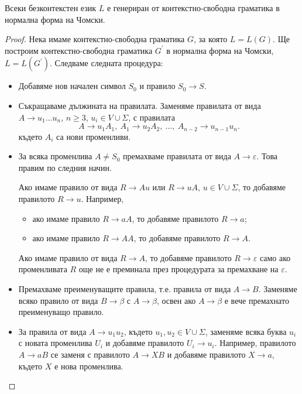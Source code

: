 \begin{thm}
  Всеки безконтекстен език $L$ е генериран от контекстно-свободна
  граматика в нормална форма на Чомски.
\end{thm}
\begin{proof}
  Нека имаме контекстно-свободна граматика $G$, за която $L = L(G)$.
  Ще построим контекстно-свободна граматика $G^\prime$ в нормална форма на Чомски, $L = L(G^\prime)$.
  Следваме следната процедура:
  \begin{itemize}
  \item
    Добавяме нов начален символ $S_0$ и правило $S_0 \to S$.
  \item
    Съкращаваме дължината на правилата.
    Заменяме правилата от вида $A\to u_1\dots u_n$, $n\geq 3$, $u_i \in V\cup\Sigma$, с
    правилата \[A\to u_1A_1,\ A_1\to u_2A_2,\ \dots,\ A_{n-2} \to u_{n-1}u_n.\]
    където $A_i$ са нови променливи.
  \item
    За всяка променлива $A \neq S_0$ премахваме правилата от вида $A\to\varepsilon$.
    Това правим по следния начин.
    
    Ако имаме правило от вида $R \to Au$ или $R\to u A$, $u \in V \cup \Sigma$,
    то добавяме правилото $R\to u$.
    Например, 
    \begin{itemize}
    \item 
      ако имаме правило $R\to aA$, то добавяме правилото $R \to a$;
    \item
      ако имаме правило $R\to AA$, то добавяме правилото $R \to A$.
    \end{itemize}
    Ако имаме правило от вида $R\to A$, то добавяме правилото $R\to\varepsilon$
    само ако променливата $R$ още не е преминала през процедурата за премахване на $\varepsilon$.
  \item
    Премахваме преименуващите правила, т.е. правила от вида $A\to B$.
    Заменяме всяко правило от вида $B \to \beta$ с $A\to \beta$,
    освен ако $A \to \beta$ е вече премахнато преименуващо правило.
  \item
    За правила от вида $A\to u_1 u_2$, където $u_1, u_2 \in V \cup \Sigma$, 
    заменяме всяка буква $u_i$ с новата променлива $U_i$
    и добавяме правилото $U_i\to u_i$.
    Например, правилото $A \to aB$ се заменя с правилото $A \to XB$ и добавяме правилото $X \to a$,
    където $X$ е нова променлива.
  \end{itemize}
\end{proof}


